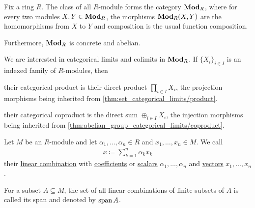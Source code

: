 \begin{definition}\label{def:category_of_modules}
  Fix a ring $R$. The class of all $R$-module forms the category $\operatorname{\mathbf{Mod}}_R$, where for every two modules $X, Y \in \operatorname{\mathbf{Mod}}_R$, the morphisms $\operatorname{\mathbf{Mod}}_R(X, Y)$ are the homomorphisms from $X$ to $Y$ and composition is the usual function composition.

  Furthermore, $\operatorname{\mathbf{Mod}}_R$ is concrete and abelian.
\end{definition}

\begin{proposition}\label{thm:module_categorical_limits}
  We are interested in categorical limits and colimits in $\operatorname{\mathbf{Mod}}_R$. If $\{ X_i \}_{i \in I}$ is an indexed family of $R$-modules, then
  \begin{defenum}
    \item\label{thm:module_categorical_limits/product} their categorical product is their direct product $\prod_{i \in I} X_i$, the projection morphisms being inherited from \cref{thm:set_categorical_limits/product}.

    \item\label{thm:module_categorical_limits/coproduct} their categorical coproduct is the direct sum $\oplus_{i \in I} X_i$, the injection morphisms being inherited from \cref{thm:abelian_group_categorical_limits/coproduct}.
  \end{defenum}
\end{proposition}

\begin{definition}\label{def:linear_combination}
  Let $M$ be an $R$-module and let $\alpha_1, \ldots, \alpha_n \in R$ and $x_1, \ldots, x_n \in M$. We call
  \begin{align*}
    x \coloneqq \sum_{k=1}^n \alpha_k x_k
  \end{align*}
  their \ul{linear combination} with \ul{coefficients} or \ul{scalars} $\alpha_1, \ldots, \alpha_n$ and \ul{vectors} $x_1, \ldots, x_n$.

  For a subset $A \subseteq M$, the set of all linear combinations of finite subsets of $A$ is called its span and denoted by $\operatorname{span}{A}$.
\end{definition}

